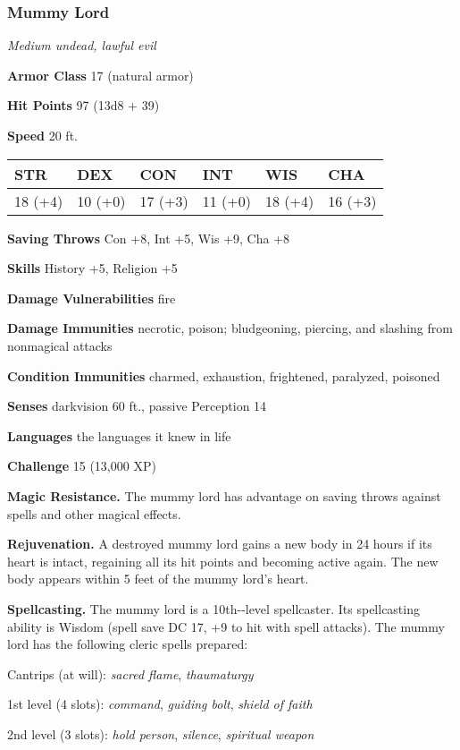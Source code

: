 \documentclass[
]{article}
\begin{document}
\hypertarget{mummy-lord}{%
\subsubsection{Mummy Lord}\label{mummy-lord}}

\emph{Medium undead, lawful evil}

\textbf{Armor Class} 17 (natural armor)

\textbf{Hit Points} 97 (13d8 + 39)

\textbf{Speed} 20 ft.

\begin{longtable}[]{@{}llllll@{}}
\toprule
STR & DEX & CON & INT & WIS & CHA\tabularnewline
\midrule
\endhead
18 (+4) & 10 (+0) & 17 (+3) & 11 (+0) & 18 (+4) & 16 (+3)\tabularnewline
\bottomrule
\end{longtable}

\textbf{Saving Throws} Con +8, Int +5, Wis +9, Cha +8

\textbf{Skills} History +5, Religion +5

\textbf{Damage Vulnerabilities} fire

\textbf{Damage Immunities} necrotic, poison; bludgeoning, piercing, and
slashing from nonmagical attacks

\textbf{Condition Immunities} charmed, exhaustion, frightened,
paralyzed, poisoned

\textbf{Senses} darkvision 60 ft., passive Perception 14

\textbf{Languages} the languages it knew in life

\textbf{Challenge} 15 (13,000 XP)

\textbf{Magic Resistance.} The mummy lord has advantage on saving throws
against spells and other magical effects.

\textbf{Rejuvenation.} A destroyed mummy lord gains a new body in 24
hours if its heart is intact, regaining all its hit points and becoming
active again. The new body appears within 5 feet of the mummy lord's
heart.

\textbf{Spellcasting.} The mummy lord is a 10th-­‐level spellcaster. Its
spellcasting ability is Wisdom (spell save DC 17, +9 to hit with spell
attacks). The mummy lord has the following cleric spells prepared:

Cantrips (at will): \emph{sacred flame}, \emph{thaumaturgy}

1st level (4 slots): \emph{command}, \emph{guiding bolt}, \emph{shield
of faith}

2nd level (3 slots): \emph{hold person}, \emph{silence}, \emph{spiritual
weapon}
\end{document}
